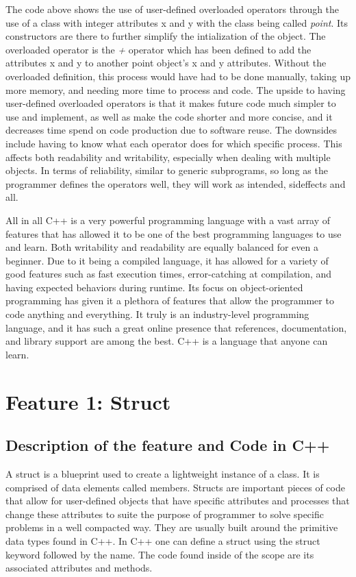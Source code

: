 \documentclass[12pt]{article}
\begin{document}
The code above shows the use of user-defined overloaded operators through the use of a class with integer attributes x and y with the class being called \textit{point}. Its constructors are there to further simplify the intialization of the object. The overloaded operator is the \textit{+} operator which has been defined to add the attributes x and y to another point object's x and y attributes. Without the overloaded definition, this process would have had to be done manually, taking up more memory, and needing more time to process and code. The upside to having user-defined overloaded operators is that it makes future code much simpler to use and implement, as well as make the code shorter and more concise, and it decreases time spend on code production due to software reuse. The downsides include having to know what each operator does for which specific process. This affects both readability and writability, especially when dealing with multiple objects. In terms of reliability, similar to generic subprograms, so long as the programmer defines the operators well, they will work as intended, sideffects and all.

All in all C++ is a very powerful programming language with a vast array of features that has allowed it to be one of the best programming languages to use and learn. Both writability and readability are equally balanced for even a beginner. Due to it being a compiled language, it has allowed for a variety of good features such as fast execution times, error-catching at compilation, and having expected behaviors during runtime. Its focus on object-oriented programming has given it a plethora of features that allow the programmer to code anything and everything. It truly is an industry-level programming language, and it has such a great online presence that references, documentation, and library support are among the best. C++ is a language that anyone can learn.

\section{Feature 1: Struct}

\subsection{Description of the feature and Code in C++}
A struct is a blueprint used to create a lightweight instance of a class. It is comprised of data elements called members. Structs are important pieces of code that allow for user-defined objects that have specific attributes and processes that change these attributes to suite the purpose of programmer to solve specific problems in a well compacted way. They are usually built around the primitive data types found in C++. In C++ one can define a struct using the struct keyword followed by the name. The code found inside of the scope are its associated attributes and methods. 
\end{document}
